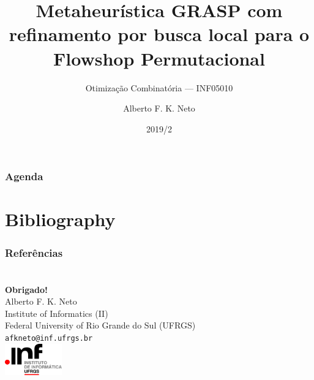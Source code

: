 \documentclass[professionalfonts]{beamer}
\title[GRASP+BL para Flowshop]{Metaheurística GRASP com refinamento por busca local para o Flowshop Permutacional}
\subtitle{Otimização Combinatória --- INF05010}
\date{2019/2}
\author{Alberto F. K. Neto}
\institute{CUSTOM LAST PAGE, CHECK BELOW}
\begin{document}
\InfTitlePage%

\begin{frame}
   \frametitle{Agenda}
   \tableofcontents
\end{frame}

\section*{Bibliography}

\begin{frame}[allowframebreaks]
  \frametitle{Referências}
  \footnotesize
  
  
\end{frame}

\section*{}

\begin{frame}[plain]
  \begin{center}
      \LARGE \textbf{Obrigado!} \normalsize \\[24pt]
      Alberto F. K. Neto\\
      \footnotesize
      \smallskip
      \color{InfGray}
      Institute of Informatics (II)\\
      Federal University of Rio Grande do Sul (UFRGS)\\
      \texttt{afkneto@inf.ufrgs.br}\\[8pt]
      \includegraphics[width=70pt]{inf-logo-white}
  \end{center}
\end{frame}
\end{document}
